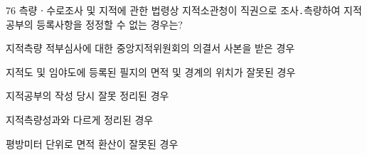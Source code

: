 \begin{question}{76}
측량ㆍ수로조사 및 지적에 관한 법령상 지적소관청이 직권으로 조사․측량하여 지적공부의 등록사항을 정정할 수 없는 경우는?
\begin{choices}
  \item 지적측량 적부심사에 대한 중앙지적위원회의 의결서 사본을 받은 경우
  \item 지적도 및 임야도에 등록된 필지의 면적 및 경계의 위치가 잘못된 경우
  \item 지적공부의 작성 당시 잘못 정리된 경우
  \item 지적측량성과와 다르게 정리된 경우
  \item 평방미터 단위로 면적 환산이 잘못된 경우
\end{choices}
\end{question}
